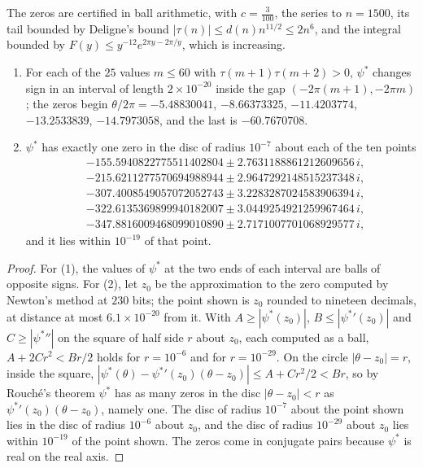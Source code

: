 The zeros are certified in ball arithmetic, with $c=\frac3{100}$, the series to $n=1500$, its tail bounded by Deligne's bound $|\tau(n)|\le d(n)n^{11/2}\le2n^6$, and the integral bounded by $F(y)\le y^{-12}e^{2\pi y-2\pi/y}$, which is increasing.

\begin{proposition}\label{prop:maxexp:psizeros}
\begin{enumerate}
\item For each of the $25$ values $m\le60$ with $\tau(m+1)\tau(m+2)>0$, $\psi^*$ changes sign in an interval of length $2\times10^{-20}$ inside the gap $(-2\pi(m+1),-2\pi m)$; the zeros begin $\theta/2\pi=-5.48830041$, $-8.66373325$, $-11.4203774$, $-13.2533839$, $-14.7973058$, and the last is $-60.7670708$.
\item $\psi^*$ has exactly one zero in the disc of radius $10^{-7}$ about each of the ten points
\[
\begin{aligned}
&-155.5940822775511402804\pm2.7631188861212609656\,i,\\
&-215.6211277570694988944\pm2.9647292148515237348\,i,\\
&-307.4008549057072052743\pm3.2283287024583906394\,i,\\
&-322.6135369899940182007\pm3.0449254921259967464\,i,\\
&-347.8816009468099010890\pm2.7171007701068929577\,i,
\end{aligned}
\]
and it lies within $10^{-19}$ of that point.
\end{enumerate}
\end{proposition}

\begin{proof}
For (1), the values of $\psi^*$ at the two ends of each interval are balls of opposite signs. For (2), let $z_0$ be the approximation to the zero computed by Newton's method at $230$ bits; the point shown is $z_0$ rounded to nineteen decimals, at distance at most $6.1\times10^{-20}$ from it. With $A\ge|\psi^*(z_0)|$, $B\le|{\psi^*}'(z_0)|$ and $C\ge|{\psi^*}''|$ on the square of half side $r$ about $z_0$, each computed as a ball, $A+2Cr^2<Br/2$ holds for $r=10^{-6}$ and for $r=10^{-29}$. On the circle $|\theta-z_0|=r$, inside the square, $|\psi^*(\theta)-{\psi^*}'(z_0)(\theta-z_0)|\le A+Cr^2/2<Br$, so by Rouch\'e's theorem $\psi^*$ has as many zeros in the disc $|\theta-z_0|<r$ as ${\psi^*}'(z_0)(\theta-z_0)$, namely one. The disc of radius $10^{-7}$ about the point shown lies in the disc of radius $10^{-6}$ about $z_0$, and the disc of radius $10^{-29}$ about $z_0$ lies within $10^{-19}$ of the point shown. The zeros come in conjugate pairs because $\psi^*$ is real on the real axis.
\end{proof}


